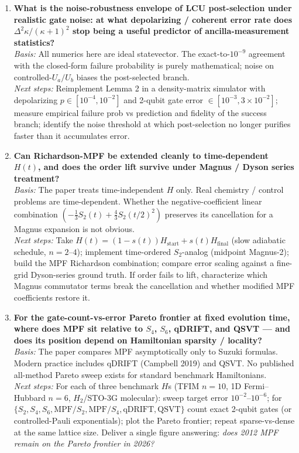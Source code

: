 \begin{enumerate}
  \item \textbf{What is the noise-robustness envelope of LCU post-selection under realistic
        gate noise: at what depolarizing / coherent error rate does
        $\Delta^2\kappa/(\kappa+1)^2$ stop being a useful predictor of ancilla-measurement
        statistics?}
        \\ \emph{Basis:} All numerics here are ideal statevector. The exact-to-$10^{-9}$
        agreement with the closed-form failure probability is purely mathematical; noise on
        controlled-$U_a/U_b$ biases the post-selected branch.
        \\ \emph{Next steps:} Reimplement Lemma 2 in a density-matrix simulator with
        depolarizing $p \in [10^{-4},10^{-2}]$ and 2-qubit gate error $\in [10^{-3},3\!\times\!10^{-2}]$;
        measure empirical failure prob vs prediction and fidelity of the success branch;
        identify the noise threshold at which post-selection no longer purifies faster than
        it accumulates error.

  \item \textbf{Can Richardson-MPF be extended cleanly to time-dependent $H(t)$, and does the
        order lift survive under Magnus / Dyson series treatment?}
        \\ \emph{Basis:} The paper treats time-independent $H$ only. Real chemistry / control
        problems are time-dependent. Whether the negative-coefficient linear combination
        $(-\tfrac{1}{3} S_2(t) + \tfrac{4}{3} S_2(t/2)^2)$ preserves its cancellation for a
        Magnus expansion is not obvious.
        \\ \emph{Next steps:} Take $H(t) = (1-s(t))H_{\text{start}} + s(t) H_{\text{final}}$
        (slow adiabatic schedule, $n=2$--$4$); implement time-ordered $S_2$-analog (midpoint
        Magnus-2); build the MPF Richardson combination; compare error scaling against a
        fine-grid Dyson-series ground truth. If order fails to lift, characterize which
        Magnus commutator terms break the cancellation and whether modified MPF coefficients
        restore it.

  \item \textbf{For the gate-count-vs-error Pareto frontier at fixed evolution time, where
        does MPF sit relative to $S_4$, $S_6$, qDRIFT, and QSVT --- and does its position
        depend on Hamiltonian sparsity / locality?}
        \\ \emph{Basis:} The paper compares MPF asymptotically only to Suzuki formulas.
        Modern practice includes qDRIFT (Campbell 2019) and QSVT. No published all-method
        Pareto sweep exists for standard benchmark Hamiltonians.
        \\ \emph{Next steps:} For each of three benchmark $H$s (TFIM $n=10$, 1D Fermi--Hubbard
        $n=6$, $H_2$/STO-3G molecular): sweep target error $10^{-2}$--$10^{-6}$; for
        $\{S_2, S_4, S_6, \text{MPF}/S_2, \text{MPF}/S_4, \text{qDRIFT}, \text{QSVT}\}$
        count exact 2-qubit gates (or controlled-Pauli exponentials); plot the Pareto
        frontier; repeat sparse-vs-dense at the same lattice size. Deliver a single figure
        answering: \emph{does 2012 MPF remain on the Pareto frontier in 2026?}
\end{enumerate}
